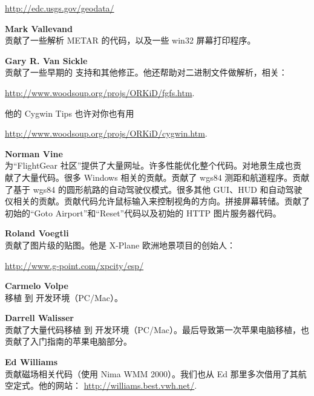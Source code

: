 \href{http://edc.usgs.gov/geodata/}{http://edc.usgs.gov/geodata/}
 \medskip

\noindent \textbf{Mark Vallevand}\\
贡献了一些解析 METAR 的代码，以及一些 win32 屏幕打印程序。
\medskip

\noindent \textbf{Gary R. Van Sickle}\\
贡献了一些早期的  支持和其他修正。他还帮助对二进制文件做解析，相关：
  \medskip

 \href{http://www.woodsoup.org/projs/ORKiD/fgfs.htm}{http://www.woodsoup.org/projs/ORKiD/fgfs.htm}.
 \medskip

\noindent
他的 Cygwin Tips 也许对你也有用
  \medskip

   \href{http://www.woodsoup.org/projs/ORKiD/cygwin.htm}{http://www.woodsoup.org/projs/ORKiD/cygwin.htm}.
  \medskip

\noindent \textbf{Norman Vine}\\
为“FlightGear 社区”提供了大量网址。许多性能优化整个代码。对地景生成也贡献了大量代码。很多 Windows 相关的贡献。贡献了 wgs84 测距和航道程序。贡献了基于 wgs84 的圆形航路的自动驾驶仪模式。很多其他 GUI、HUD 和自动驾驶仪相关的贡献。贡献代码允许鼠标输入来控制视角的方向。拼接屏幕转储。贡献了初始的“Goto Airport”和“Reset”代码以及初始的 HTTP 图片服务器代码。
\medskip

\noindent \textbf{Roland Voegtli}\\
贡献了图片级的贴图。他是 X-Plane 欧洲地景项目的创始人：
 \medskip

  \href{http://www.g-point.com/xpcity/esp/}{http://www.g-point.com/xpcity/esp/}
\medskip

\noindent \textbf{Carmelo Volpe}\\
移植 \FlightGear{} 到  开发环境（PC/Mac）。
 \medskip

\noindent \textbf{Darrell Walisser}\\
贡献了大量代码移植 \FlightGear{} 到  开发环境（PC/Mac）。最后导致第一次苹果电脑移植，也贡献了入门指南的苹果电脑部分。
\medskip

\noindent \textbf{Ed Williams}\\
贡献磁场相关代码（使用 Nima WMM 2000）。我们也从 Ed 那里多次借用了其航空定式。他的网站：
  \medskip
  \href{http://williams.best.vwh.net/}{http://williams.best.vwh.net/}.
 \medskip

